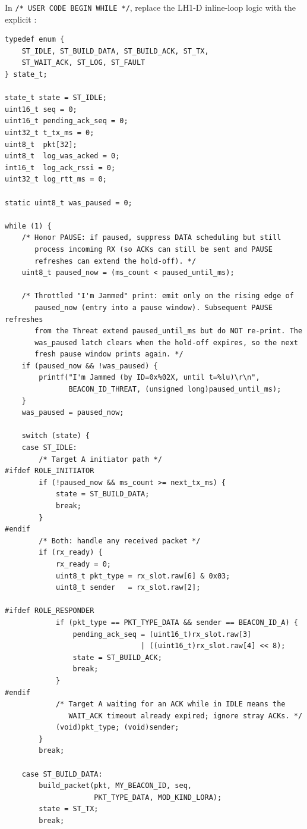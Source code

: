 \documentclass[11pt,letterpaper]{article}
\begin{document}
In \texttt{/* USER CODE BEGIN WHILE */}, replace the LH1-D inline-loop logic with the explicit \FSM{}:
\begin{verbatim}
typedef enum {
    ST_IDLE, ST_BUILD_DATA, ST_BUILD_ACK, ST_TX,
    ST_WAIT_ACK, ST_LOG, ST_FAULT
} state_t;

state_t state = ST_IDLE;
uint16_t seq = 0;
uint16_t pending_ack_seq = 0;
uint32_t t_tx_ms = 0;
uint8_t  pkt[32];
uint8_t  log_was_acked = 0;
int16_t  log_ack_rssi = 0;
uint32_t log_rtt_ms = 0;

static uint8_t was_paused = 0;

while (1) {
    /* Honor PAUSE: if paused, suppress DATA scheduling but still
       process incoming RX (so ACKs can still be sent and PAUSE
       refreshes can extend the hold-off). */
    uint8_t paused_now = (ms_count < paused_until_ms);

    /* Throttled "I'm Jammed" print: emit only on the rising edge of
       paused_now (entry into a pause window). Subsequent PAUSE refreshes
       from the Threat extend paused_until_ms but do NOT re-print. The
       was_paused latch clears when the hold-off expires, so the next
       fresh pause window prints again. */
    if (paused_now && !was_paused) {
        printf("I'm Jammed (by ID=0x%02X, until t=%lu)\r\n",
               BEACON_ID_THREAT, (unsigned long)paused_until_ms);
    }
    was_paused = paused_now;

    switch (state) {
    case ST_IDLE:
        /* Target A initiator path */
#ifdef ROLE_INITIATOR
        if (!paused_now && ms_count >= next_tx_ms) {
            state = ST_BUILD_DATA;
            break;
        }
#endif
        /* Both: handle any received packet */
        if (rx_ready) {
            rx_ready = 0;
            uint8_t pkt_type = rx_slot.raw[6] & 0x03;
            uint8_t sender   = rx_slot.raw[2];

#ifdef ROLE_RESPONDER
            if (pkt_type == PKT_TYPE_DATA && sender == BEACON_ID_A) {
                pending_ack_seq = (uint16_t)rx_slot.raw[3]
                                | ((uint16_t)rx_slot.raw[4] << 8);
                state = ST_BUILD_ACK;
                break;
            }
#endif
            /* Target A waiting for an ACK while in IDLE means the
               WAIT_ACK timeout already expired; ignore stray ACKs. */
            (void)pkt_type; (void)sender;
        }
        break;

    case ST_BUILD_DATA:
        build_packet(pkt, MY_BEACON_ID, seq,
                     PKT_TYPE_DATA, MOD_KIND_LORA);
        state = ST_TX;
        break;


\end{verbatim}
\end{document}
